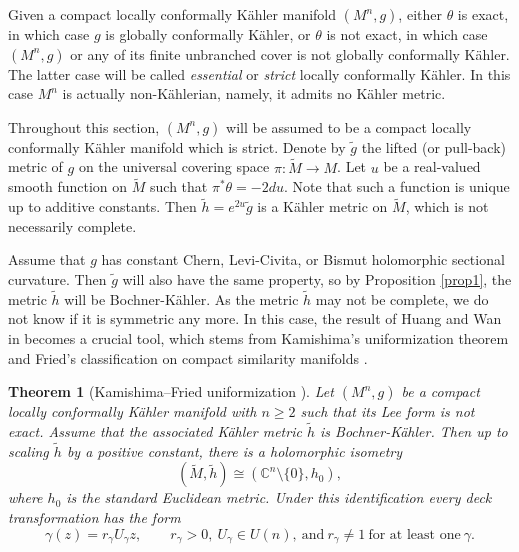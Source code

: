 \documentclass{amsart}
\newtheorem{theorem}{Theorem}%
\newcommand{\C}{{\mathbb C}}
\numberwithin{equation}{section}
\begin{document}
Given a compact locally conformally K\"ahler manifold $(M^n,g)$, either $\theta$ is exact, in which case $g$ is globally conformally K\"ahler, or $\theta$ is not exact, in which case $(M^n,g)$ or any of its finite unbranched cover is not globally conformally K\"ahler. The latter case will be called {\em essential} or {\em strict} locally conformally K\"ahler. In this case $M^n$ is actually non-K\"ahlerian, namely, it admits no K\"ahler metric.

Throughout this section, $(M^n,g)$ will be assumed to be a compact locally conformally K\"ahler manifold which is strict. Denote by $\widetilde{g}$ the lifted (or pull-back) metric of $g$ on the universal covering space $\pi: \widetilde{M} \rightarrow M$. Let $u$ be a real-valued smooth function on $\widetilde{M}$ such that $\pi^{\ast}\theta = -2du$. Note that such a function is unique up to additive constants. Then $\widetilde{h}=e^{2u}\widetilde{g}$ is a K\"ahler metric on $\widetilde{M}$, which is not necessarily complete.

Assume that $g$ has constant Chern, Levi-Civita, or Bismut holomorphic sectional curvature. Then $\widetilde{g}$ will also have the same property, so by Proposition \ref{prop1}, the metric $\widetilde{h}$ will be Bochner-K\"ahler. As the metric $\widetilde{h}$ may not be complete, we do not know if it is symmetric any more. In this case, the result of Huang and Wan in \cite[Proposition 5.1]{HW} becomes a crucial tool, which stems from Kamishima's uniformization theorem \cite{Kamishima1994, Kamishima2005, Kamishima2006} and Fried's classification on compact similarity manifolds \cite{Fried1980}.

\begin{theorem}[Kamishima--Fried uniformization \cite{HW}]\label{thm:uniformization}
Let \((M^n,g)\) be a compact locally conformally K\"ahler manifold with \(n\geq2\) such that its Lee form is not exact. Assume that the associated K\"ahler metric $\widetilde{h}$ is Bochner-K\"ahler.  Then up to scaling $\widetilde{h}$ by a positive constant, there is a holomorphic
isometry
\[
 (\widetilde M,\widetilde h)
 \cong(\C^n\setminus\{0\},h_{0}),
\]
where $h_0$ is the standard Euclidean metric. Under this identification every deck transformation has the form
\begin{equation} \label{eq:deck}
 \gamma(z)=r_\gamma U_\gamma z,
 \qquad r_\gamma>0,\   U_\gamma\in U(n), \   \mbox{and} \ r_\gamma\neq1 \ \mbox{for at least one} \  \gamma .
\end{equation}
\end{theorem}
\end{document}
